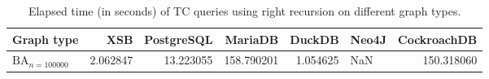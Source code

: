 \begin{table}
\caption{Elapsed time (in seconds) of TC queries using right recursion on different graph types.}
\label{table:right_recursion_real_time}
\begin{tabular}{lrrrrlr}
\toprule
Graph type & XSB & PostgreSQL & MariaDB & DuckDB & Neo4J & CockroachDB \\
\midrule
$\text{BA}_{n=100000}$ & 2.062847 & 13.223055 & 158.790201 & 1.054625 & NaN & 150.318060 \\
\bottomrule
\end{tabular}
\end{table}
